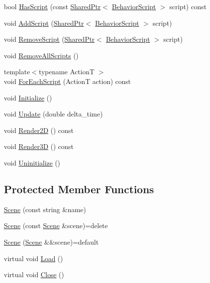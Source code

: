 \begin{DoxyCompactItemize}
\item 
bool \hyperlink{classmage_1_1_scene_a31469e19b181d0cb08bf10c554d28a6d}{Has\+Script} (const \hyperlink{namespacemage_a1e01ae66713838a7a67d30e44c67703e}{Shared\+Ptr}$<$ \hyperlink{classmage_1_1_behavior_script}{Behavior\+Script} $>$ script) const
\item 
void \hyperlink{classmage_1_1_scene_ab97b66c81c32681699052e154d0e0722}{Add\+Script} (\hyperlink{namespacemage_a1e01ae66713838a7a67d30e44c67703e}{Shared\+Ptr}$<$ \hyperlink{classmage_1_1_behavior_script}{Behavior\+Script} $>$ script)
\item 
void \hyperlink{classmage_1_1_scene_a82705ba56543dea410439760b1667bc5}{Remove\+Script} (\hyperlink{namespacemage_a1e01ae66713838a7a67d30e44c67703e}{Shared\+Ptr}$<$ \hyperlink{classmage_1_1_behavior_script}{Behavior\+Script} $>$ script)
\item 
void \hyperlink{classmage_1_1_scene_a04b6e0b4d9ca18d15d3da098e581d336}{Remove\+All\+Scripts} ()
\item 
{\footnotesize template$<$typename ActionT $>$ }\\void \hyperlink{classmage_1_1_scene_a4d16d973adce12868b9a0df9d92ef6d6}{For\+Each\+Script} (ActionT action) const
\item 
void \hyperlink{classmage_1_1_scene_a3cd12ef381ca743bf0b8f8aa2a76eb57}{Initialize} ()
\item 
void \hyperlink{classmage_1_1_scene_aa10e6eafc00834f63f146589326cbfe2}{Update} (double delta\+\_\+time)
\item 
void \hyperlink{classmage_1_1_scene_a53487349d68f0ffcc91b243d0cfb86a3}{Render2D} () const
\item 
void \hyperlink{classmage_1_1_scene_a51d2d441067d30cf3a444d6a80811f93}{Render3D} () const
\item 
void \hyperlink{classmage_1_1_scene_a714dc33c04dc2b8e2cec93564905b174}{Uninitialize} ()
\end{DoxyCompactItemize}
\subsection*{Protected Member Functions}
\begin{DoxyCompactItemize}
\item 
\hyperlink{classmage_1_1_scene_aab61b38547fc53aa9c5b3b559f4d2e26}{Scene} (const string \&name)
\item 
\hyperlink{classmage_1_1_scene_a88d83ccb2e10549d5370f850b2b4c228}{Scene} (const \hyperlink{classmage_1_1_scene}{Scene} \&scene)=delete
\item 
\hyperlink{classmage_1_1_scene_a35b8fc4242c2348e53014b96416fc3d3}{Scene} (\hyperlink{classmage_1_1_scene}{Scene} \&\&scene)=default
\item 
virtual void \hyperlink{classmage_1_1_scene_a1fb4a93eaa2f6a9e20594e205abb9a32}{Load} ()
\item 
virtual void \hyperlink{classmage_1_1_scene_a16786d7fcf0b813e2e94061b082cfd1d}{Close} ()
\end{DoxyCompactItemize}
